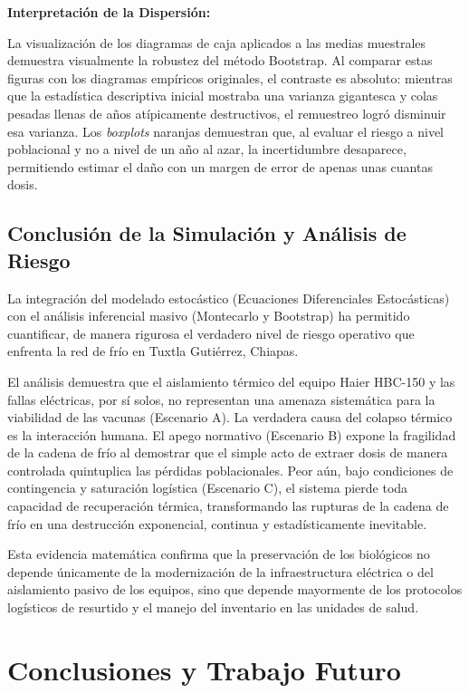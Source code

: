 \documentclass[
  spanish,
  letterpaper,
  DIV=11,
  numbers=noendperiod]{scrreprt}
\theoremstyle{plain}
\theoremstyle{plain}
\theoremstyle{plain}
\theoremstyle{definition}
\theoremstyle{remark}
\begin{document}
\textbf{Interpretación de la Dispersión:}

La visualización de los diagramas de caja aplicados a las medias
muestrales demuestra visualmente la robustez del método Bootstrap. Al
comparar estas figuras con los diagramas empíricos originales, el
contraste es absoluto: mientras que la estadística descriptiva inicial
mostraba una varianza gigantesca y colas pesadas llenas de años
atípicamente destructivos, el remuestreo logró disminuir esa varianza.
Los \emph{boxplots} naranjas demuestran que, al evaluar el riesgo a
nivel poblacional y no a nivel de un año al azar, la incertidumbre
desaparece, permitiendo estimar el daño con un margen de error de apenas
unas cuantas dosis.

\section{Conclusión de la Simulación y Análisis de
Riesgo}\label{conclusiuxf3n-de-la-simulaciuxf3n-y-anuxe1lisis-de-riesgo}

La integración del modelado estocástico (Ecuaciones Diferenciales
Estocásticas) con el análisis inferencial masivo (Montecarlo y
Bootstrap) ha permitido cuantificar, de manera rigurosa el verdadero
nivel de riesgo operativo que enfrenta la red de frío en Tuxtla
Gutiérrez, Chiapas.

El análisis demuestra que el aislamiento térmico del equipo Haier
HBC-150 y las fallas eléctricas, por sí solos, no representan una
amenaza sistemática para la viabilidad de las vacunas (Escenario A). La
verdadera causa del colapso térmico es la interacción humana. El apego
normativo (Escenario B) expone la fragilidad de la cadena de frío al
demostrar que el simple acto de extraer dosis de manera controlada
quintuplica las pérdidas poblacionales. Peor aún, bajo condiciones de
contingencia y saturación logística (Escenario C), el sistema pierde
toda capacidad de recuperación térmica, transformando las rupturas de la
cadena de frío en una destrucción exponencial, continua y
estadísticamente inevitable.

Esta evidencia matemática confirma que la preservación de los biológicos
no depende únicamente de la modernización de la infraestructura
eléctrica o del aislamiento pasivo de los equipos, sino que depende
mayormente de los protocolos logísticos de resurtido y el manejo del
inventario en las unidades de salud.


\chapter{Conclusiones y Trabajo
Futuro}\label{conclusiones-y-trabajo-futuro}
\end{document}
